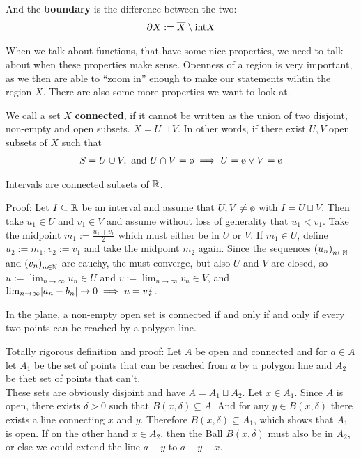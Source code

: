 And the \textbf{boundary} is the difference between the two:
\begin{align*}
	\partial X := \overline{X} \setminus \text{int} X
\end{align*}

When we talk about functions, that have some nice properties, we need to talk about when these properties make sense. Openness of a region is very important, as we then are able to ``zoom in'' enough to make our statements wihtin the region $X$. There are also some more properties we want to look at.

We call a set $X$ \textbf{connected}, if it cannot be written as the union of two disjoint, non-empty and open subsets. $X = U \sqcup V$. In other words, if there exist $U,V$ open subsets of $X$ such that
\begin{align*}
	S = U \cup V, \text{ and } U \cap V = \es  \implies U = \es \lor V = \es
\end{align*}

\begin{proposition}[]
	Intervals are connected subsets of $\mathbb{R}$.	
\end{proposition}
Proof: Let $I \subseteq \mathbb{R}$ be an interval and assume that $U, V \neq \es$ with $I = U \sqcup V$. Then take $u_1 \in U$ and $v_1 \in V$ and assume without loss of generality that $u_1 < v_1$. Take the midpoint $m_1 := \frac{u_1 + v_1}{2}$ which must either be in $U$ or $V$. If $m_1 \in U$, define $u_2 := m_1, v_2 := v_1$ and take the midpoint $m_2$ again. Since the sequences $\left(u_{n}\right)_{n \in \mathbb{N}}$ and $\left(v_{n}\right)_{n \in \mathbb{N}}$ are cauchy, the must converge, but also $U$ and $V$ are closed, so $u:= \lim_{n \to \infty} u_n \in U$ and $v:= \lim_{n \to \infty} v_n \in V$, and $\lim_{n \to \infty} \abs{a_n - b_n} \to 0 \implies u = v \lightning$.\\

\begin{theorem}[]
	In the plane, a non-empty open set is connected if and only if and only if every two points can be reached by a polygon line.
\end{theorem}
Totally rigorous definition and proof: Let $A$ be open and connected and for $a \in A$ let $A_1$ be the set of points that can be reached from $a$ by a polygon line and $A_2$ be thet set of points that can't.\\

These sets are obviously disjoint and have $A = A_1 \sqcup A_2$. Let $x \in A_1$. Since $A$ is open, there exists $\delta > 0$ such that $B(x,\delta) \subseteq A$. And for any $y \in B(x, \delta)$ there exists a line connecting $x$ and $y$. Therefore $B(x,\delta) \subseteq A_1$, which shows that $A_1$ is open. If on the other hand $x \in A_2$, then the Ball $B(x, \delta)$ must also be in $A_2$, or else we could extend the line $a-y$ to $a-y-x$.\\

